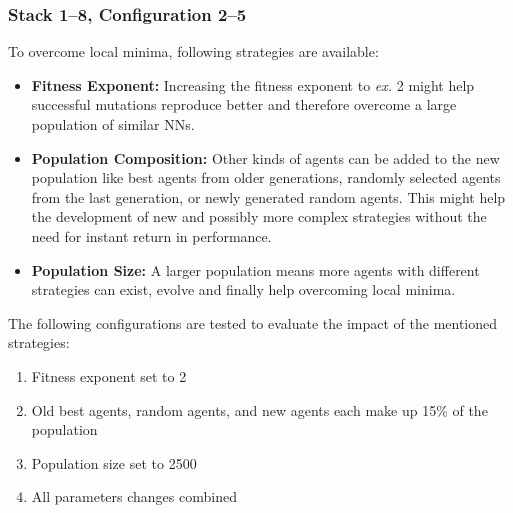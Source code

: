 \subsubsection{Stack 1--8, Configuration 2--5}
To overcome local minima, following strategies are available:
\begin{itemize}
    \item \textbf{Fitness Exponent:} Increasing the fitness exponent to \textit{ex.} 2 might help successful mutations reproduce better and therefore overcome a large population of similar NNs.
    \item \textbf{Population Composition:} Other kinds of agents can be added to the new population like best agents from older generations, randomly selected agents from the last generation, or newly generated random agents.
    This might help the development of new and possibly more complex strategies without the need for instant return in performance.
    \item \textbf{Population Size:} A larger population means more agents with different strategies can exist, evolve and finally help overcoming local minima.
\end{itemize}
The following configurations are tested to evaluate the impact of the mentioned strategies:
\begin{enumerate}
    \item Fitness exponent set to 2
    \item Old best agents, random agents, and new agents each make up 15\% of the population
    \item Population size set to 2500
    \item All parameters changes combined
\end{enumerate}
